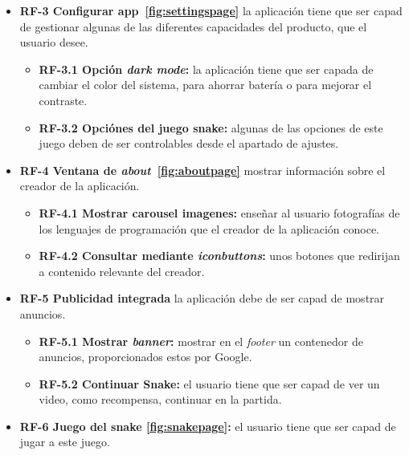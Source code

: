 \begin{itemize}
	\item \textbf{RF-3 Configurar app~\ref{fig:settingspage}} la aplicación tiene que ser capad de gestionar algunas de las diferentes capacidades del producto, que el usuario desee.
	
	\begin{itemize}
		\tightlist
		\item \textbf{RF-3.1 Opción \emph{dark mode}:} la aplicación tiene que ser capada de cambiar el color del sistema, para ahorrar batería o para mejorar el contraste.
		\item \textbf{RF-3.2 Opciónes del juego snake:} algunas de las opciones de este juego deben de ser controlables desde el apartado de ajustes.
	\end{itemize}
	
	\item \textbf{RF-4 Ventana de \emph{about}~\ref{fig:aboutpage}} mostrar información sobre el creador de la aplicación.
	
	\begin{itemize}
		\tightlist
		\item \textbf{RF-4.1 Mostrar carousel imagenes:} enseñar al usuario fotografías de los lenguajes de programación que el creador de la aplicación conoce.
		\item \textbf{RF-4.2 Consultar mediante \emph{iconbuttons}:} unos botones que redirijan a contenido relevante del creador.
	\end{itemize}
	
	\item \textbf{RF-5 Publicidad integrada} la aplicación debe de ser capad de mostrar anuncios.
	
	\begin{itemize}
		\tightlist
		\item \textbf{RF-5.1 Mostrar \emph{banner}:} mostrar en el \emph{footer} un contenedor de anuncios, proporcionados estos por Google.
		\item \textbf{RF-5.2 Continuar Snake:} el usuario tiene que ser capad de ver un video, como recompensa, continuar en la partida. 
	\end{itemize}

	\item \textbf{RF-6 Juego del snake \ref{fig:snakepage}:} el usuario tiene que ser capad de jugar a este juego.
	

\end{itemize}
